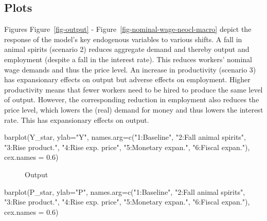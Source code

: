 \documentclass[
  letterpaper,
  DIV=11,
  numbers=noendperiod]{scrreprt}
\newenvironment{Shaded}{\begin{snugshade}}{\end{snugshade}}
\newcommand{\AttributeTok}[1]{\textcolor[rgb]{0.40,0.45,0.13}{#1}}
\newcommand{\FloatTok}[1]{\textcolor[rgb]{0.68,0.00,0.00}{#1}}
\newcommand{\FunctionTok}[1]{\textcolor[rgb]{0.28,0.35,0.67}{#1}}
\newcommand{\NormalTok}[1]{\textcolor[rgb]{0.00,0.23,0.31}{#1}}
\newcommand{\StringTok}[1]{\textcolor[rgb]{0.13,0.47,0.30}{#1}}
\begin{document}
\subsection{Plots}\label{plots-2}

Figures Figure~\ref{fig-output} -
Figure~\ref{fig-nominal-wage-neocl-macro} depict the response of the
model's key endogenous variables to various shifts. A fall in animal
spirits (scenario 2) reduces aggregate demand and thereby output and
employment (despite a fall in the interest rate). This reduces workers'
nominal wage demands and thus the price level. An increase in
productivity (scenario 3) has expansionary effects on output but adverse
effects on employment. Higher productivity means that fewer workers need
to be hired to produce the same level of output. However, the
corresponding reduction in employment also reduces the price level,
which lowers the (real) demand for money and thus lowers the interest
rate. This has expansionary effects on output.

\begin{Shaded}
\begin{Highlighting}[]
\FunctionTok{barplot}\NormalTok{(Y\_star, }\AttributeTok{ylab=}\StringTok{"Y"}\NormalTok{, }\AttributeTok{names.arg=}\FunctionTok{c}\NormalTok{(}\StringTok{"1:Baseline"}\NormalTok{, }\StringTok{"2:Fall animal spirits"}\NormalTok{, }\StringTok{"3:Rise product."}\NormalTok{,}
                                      \StringTok{"4:Rise exp. price"}\NormalTok{, }\StringTok{"5:Monetary expan."}\NormalTok{, }\StringTok{"6:Fiscal expan."}\NormalTok{), }\AttributeTok{cex.names =} \FloatTok{0.6}\NormalTok{)}
\end{Highlighting}
\end{Shaded}

\begin{figure}[H]


\caption{\label{fig-output-neocl-macro}Output}

\end{figure}%

\begin{Shaded}
\begin{Highlighting}[]
\FunctionTok{barplot}\NormalTok{(P\_star, }\AttributeTok{ylab=}\StringTok{"P"}\NormalTok{, }\AttributeTok{names.arg=}\FunctionTok{c}\NormalTok{(}\StringTok{"1:Baseline"}\NormalTok{, }\StringTok{"2:Fall animal spirits"}\NormalTok{, }\StringTok{"3:Rise product."}\NormalTok{,}
                                      \StringTok{"4:Rise exp. price"}\NormalTok{, }\StringTok{"5:Monetary expan."}\NormalTok{, }\StringTok{"6:Fiscal expan."}\NormalTok{), }\AttributeTok{cex.names =} \FloatTok{0.6}\NormalTok{)}
\end{Highlighting}
\end{Shaded}
\end{document}
